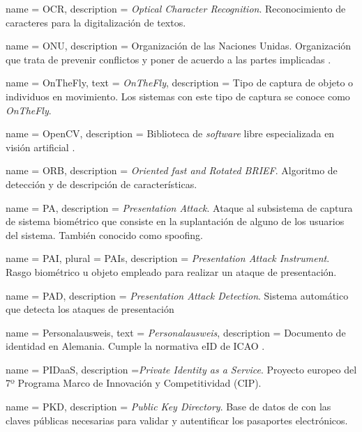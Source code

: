 {
    name        = {OCR},
    description = {\textit{Optical Character Recognition}. Reconocimiento de caracteres para la digitalización de textos.}
}

{
    name        = {ONU},
    description = {Organización de las Naciones Unidas. Organización que trata de  prevenir conflictos y poner de acuerdo a las partes implicadas \cite{ONUOnline}.}
}

{
    name        = {OnTheFly},
    text        = {\textit{OnTheFly}},
    description = {Tipo de captura de objeto o individuos en movimiento. Los sistemas  con este tipo de captura se conoce como  \textit{OnTheFly}.}
}

{
    name        = {OpenCV},
    description = {Biblioteca de \textit{software} libre especializada en visión artificial \cite{openCVOnline}.}
}

{
    name        = {ORB},
    description = {\textit{Oriented fast and Rotated BRIEF}. Algoritmo de detección y de descripción de  características.}
}

{
    name        = {PA},
    description = {\textit{Presentation Attack}. Ataque al subsistema de captura de sistema biométrico que consiste en la suplantación de alguno de los usuarios del sistema. También conocido como \gls{spoofing}.}
}

{
    name        = {PAI},
    plural      = {PAIs},
    description = {\textit{Presentation Attack Instrument}. Rasgo biométrico u objeto empleado para realizar un ataque de presentación.}
}

{
    name        = {PAD},
    description = {\textit{Presentation Attack Detection}. Sistema automático que detecta los ataques de presentación}
}

{
    name        = {Personalausweis},
    text        = {\mbox{\textit{Personalausweis}}},
    description = {Documento de identidad en Alemania. Cumple la normativa \gls{eID} de ICAO \cite{doc20069303}.}
}

{
    name        = {PIDaaS},
    description ={\textit{Private Identity as a Service}. Proyecto europeo del 7º Programa Marco de Innovación y Competitividad (CIP).}
}

{
    name        = {PKD},
    description = {\textit{Public Key Directory}. Base de datos de  con las claves públicas necesarias para validar y autentificar los pasaportes electrónicos.}
}

